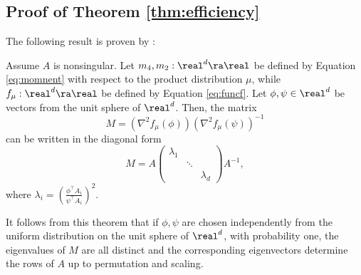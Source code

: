 \subsection{Proof of Theorem \ref{thm:efficiency}}
\label{subsec:ProofEfficiency}
The following result is proven by \citet{hsu2013learning}:
\begin{thm}
Assume $A$ is nonsingular. 
Let $m_4,m_2:\real^d \ra \real$ be defined by Equation \eqref{eq:momnent} with respect to the product distribution $\mu$,
	while $f_{\mu}: \real^d \ra \real$ be defined by Equation \eqref{eq:funcf}.
Let $\phi,\psi\in \real^d$ be vectors from the unit sphere of $\real^d$. Then, 
	the matrix
\begin{equation}
\label{eq:M}
M =(\nabla^2f_{\mu}(\phi))(\nabla^2f_{\mu}(\psi))^{-1} 
\end{equation}
can be written in the diagonal form
\begin{equation}
\label{eq:M2}
M = A 
\left(
\begin{array}{ccc}
\lambda_1 & & \\ %
    & \ddots & \\
    & & \lambda_d %
\end{array} 
\right) 
A^{-1},
\end{equation}
where $\lambda_i = \left(\frac{\phi^{\top}A_i}{\psi^{\top}A_i}\right)^2$.
\end{thm}

It follows from this theorem that 
if $\phi,\psi$ are chosen independently from the uniform distribution on the unit sphere of $\real^d$, with probability one,
the eigenvalues of  $M$ are all distinct and the corresponding eigenvectors
determine the rows of $A$ up to permutation and scaling.

